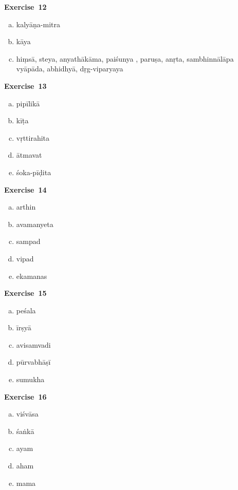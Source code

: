 \begin{multicols}{2}
\noindent\textbf{Exercise~12}
\vspace{-10pt}
\begin{enumerate}[a.]
\itemsep=0pt
\item kalyāṇa-mitra 
\item kāya 
\item hiṃsā, steya, anyathākāma, paiśunya , paruṣa, anṛta, sambhinnālāpa vyāpāda, abhidhyā, dṛg-viparyaya
\end{enumerate}

\noindent\textbf{Exercise~13}
\vspace{-10pt}
\begin{enumerate}[a.]
\itemsep=0pt
\item pipīlikā 
\item kīṭa
\item vṛttirahita
\item ātmavat
\item śoka-pīḍita
\end{enumerate}

\noindent\textbf{Exercise~14}
\vspace{-10pt}
\begin{enumerate}[a.]
\itemsep=0pt
\item arthin
\item avamanyeta
\item sampad
\item vipad
\item ekamanas
\end{enumerate}

\noindent\textbf{Exercise~15}
\vspace{-10pt}
\begin{enumerate}[a.]
\itemsep=0pt
\item peśala 
\item īrṣyā
\item avisamvadi
\item pūrvabhāṣī 
\item sumukha
\end{enumerate}

\noindent\textbf{Exercise~16}
\vspace{-10pt}
\begin{enumerate}[a.]
\itemsep=0pt
\item viśvāsa 
\item śaṅkā
\item ayam
\item aham
\item mama
\end{enumerate}


\end{multicols}
